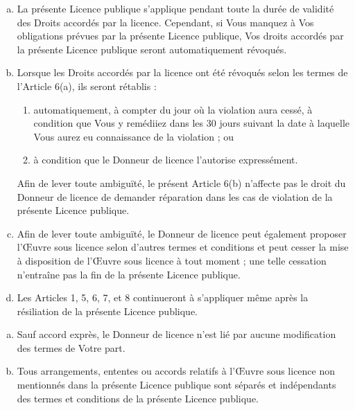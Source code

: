 \begin{enumerate}[a.]
\item La présente Licence publique s’applique pendant toute la durée de validité des Droits accordés par la licence. Cependant, si Vous manquez à Vos obligations prévues par la présente Licence publique, Vos droits accordés par la présente Licence publique seront automatiquement révoqués.
\item Lorsque les Droits accordés par la licence ont été révoqués selon les termes de l’Article 6(a), ils seront rétablis :
\begin{enumerate}[1.]
\item automatiquement, à compter du jour où la violation aura cessé, à condition que Vous y remédiiez dans les 30 jours suivant la date à laquelle Vous aurez eu connaissance de la violation ; ou
\item à condition que le Donneur de licence l’autorise expressément.
\end{enumerate}
Afin de lever toute ambiguïté, le présent Article 6(b) n’affecte pas le droit du Donneur de licence de demander réparation dans les cas de violation de la présente Licence publique.
\item Afin de lever toute ambiguïté, le Donneur de licence peut également proposer l’Œuvre sous licence selon d’autres termes et conditions et peut cesser la mise à disposition de l’Œuvre sous licence à tout moment ; une telle cessation n’entraîne pas la fin de la présente Licence publique.
\item Les Articles 1, 5, 6, 7, et 8 continueront à s’appliquer même après la résiliation de la présente Licence publique.
\end{enumerate}


\begin{enumerate}[a.]
\item Sauf accord exprès, le Donneur de licence n’est lié par aucune modification des termes de Votre part.
\item Tous arrangements, ententes ou accords relatifs à l’Œuvre sous licence non mentionnés dans la présente Licence publique sont séparés et indépendants des termes et conditions de la présente Licence publique.
\end{enumerate}


